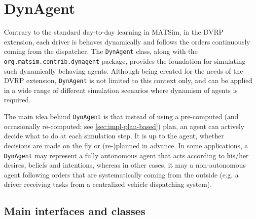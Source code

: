 
\section{DynAgent}
\label{sec:dynAgent}

Contrary to the standard day-to-day learning in MATSim, in the DVRP extension, each driver is behaves dynamically and follows the orders continuously coming from the dispatcher. The \lstinline$DynAgent$ class, along with the \lstinline$org.matsim.contrib.dynagent$ package, provides the foundation for simulating such dynamically behaving agents. Although  being created for the needs of the DVRP extension, \lstinline$DynAgent$ is not limited to this context only, and can be applied in a wide range of different simulation scenarios where dynamism of agents is required.

The main idea behind \lstinline$DynAgent$ is that instead of using a pre-computed (and occasionally re-computed; see \ref{sec:impl-plan-based}) plan, an agent can actively decide what to do at each simulation step. It is up to the agent, whether decisions are made on the fly or (re-)planned in advance. In some applications, a \lstinline$DynAgent$ may represent a fully autonomous agent that acts according to his/her desires, beliefs and intentions, whereas in other cases, it may a non-autonomous agent following orders that are systematically coming from the outside (e.g. a driver receiving tasks from a centralized vehicle dispatching system).

\subsection{Main interfaces and classes}

